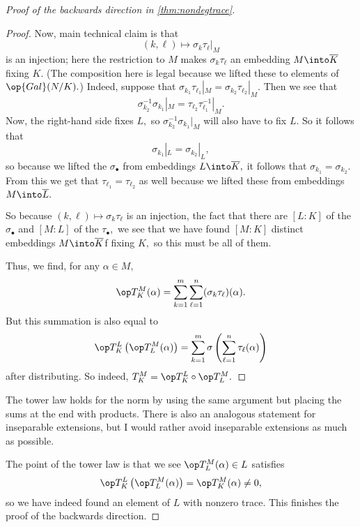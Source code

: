 \begin{proof}[Proof of the backwards direction in \autoref{thm:nondegtrace}]
\begin{proof}
		Now, main technical claim is that
		\[(k,\ell)\mapsto\sigma_k\tau_\ell|_M\]
		is an injection; here the restriction to $M$ makes $\sigma_k\tau_\ell$ an embedding $M\into\overline K$ fixing $K.$ (The composition here is legal because we lifted these to elements of $\op{Gal}(N/K).$) Indeed, suppose that $\sigma_{k_1}\tau_{\ell_1}|_M=\sigma_{k_2}\tau_{\ell_2}|_M.$ Then we see that
		\[\sigma_{k_2}^{-1}\sigma_{k_1}|
		_M=\tau_{\ell_2}\tau_{\ell_1}^{-1}|_M.\]
		Now, the right-hand side fixes $L,$ so $\sigma_{k_2}^{-1}\sigma_{k_1}|_M$ will also have to fix $L.$ So it follows that
		\[\sigma_{k_1}|_L=\sigma_{k_2}|_L,\]
		so because we lifted the $\sigma_\bullet$ from embeddings $L\into\overline K,$ it follows that $\sigma_{k_1}=\sigma_{k_2}.$ From this we get that $\tau_{\ell_1}=\tau_{\ell_2}$ as well because we lifted these from embeddings $M\into\overline L.$

		So because $(k,\ell)\mapsto\sigma_k\tau_\ell$ is an injection, the fact that there are $[L:K]$ of the $\sigma_\bullet$ and $[M:L]$ of the $\tau_\bullet,$ we see that we have found $[M:K]$ distinct embeddings $M\into\overline K$f fixing $K,$ so this must be all of them.
		
		Thus, we find, for any $\alpha\in M,$
		\[\op T^M_K(\alpha)=\sum_{k=1}^m\sum_{\ell=1}^n(\sigma_k\tau_\ell)(\alpha).\]
		But this summation is also equal to
		\[\op T^L_K\left(\op T^M_L(\alpha)\right)=\sum_{k=1}^m\sigma\left(\sum_{\ell=1}^n\tau_\ell(\alpha)\right)\]
		after distributing. So indeed, $T^M_K=\op T^L_K\circ\op T^M_L.$
	\end{proof}
	\begin{remark}[Nir]
		The tower law holds for the norm by using the same argument but placing the sums at the end with products. There is also an analogous statement for inseparable extensions, but I would rather avoid inseparable extensions as much as possible.
	\end{remark}
	The point of the tower law is that we see $\op T^M_L(\alpha)\in L$ satisfies
	\[\op T^L_K\left(\op T^M_L(\alpha)\right)=\op T^M_K(\alpha)\ne0,\]
	so we have indeed found an element of $L$ with nonzero trace. This finishes the proof of the backwards direction.
\end{proof}
